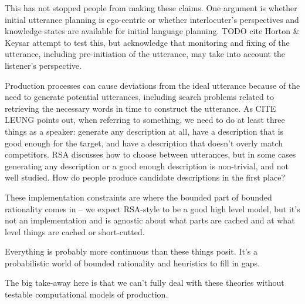 \documentclass[]{article}
\begin{document}
This has not stopped people from making these claims. One argument is whether initial utterance planning is ego-centric or whether interlocuter's perspectives and knowledge states are available for initial language planning. TODO cite Horton \& Keysar attempt to test this, but acknowledge that monitoring and fixing of the utterance, including pre-initiation of the utterance, may take into account the listener's perspective. %

%



Production processes can cause deviations from the ideal utterance because of the need to generate potential utterances, including search problems related to retrieving the necessary words in time to construct the utterance. As CITE LEUNG points out, when referring to something, we need to do at least three things as a speaker: generate any description at all, have a description that is good enough for the target, and have a description that doesn't overly match competitors. RSA discusses how to choose between utterances, but in some cases generating any description or a good enough description is non-trivial, and not well studied. How do people produce candidate descriptions in the first place? 



These implementation constraints are where the bounded part of bounded rationality comes in -- we expect RSA-style to be a good high level model, but it's not an implementation and is agnostic about what parts are cached and at what level things are cached or short-cutted. 

Everything is probably more continuous than these things posit. It's a probabilistic world of bounded rationality and heuristics to fill in gaps. 

The big take-away here is that we can't fully deal with these theories without testable computational models of production. %
\end{document}
